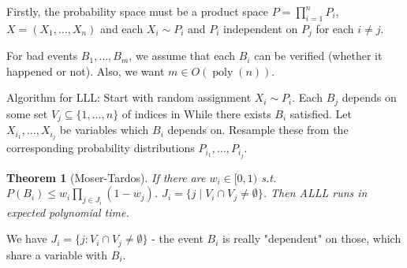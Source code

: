 \documentclass{article}
\theoremstyle{plain}
\newtheorem{thm}{Theorem}
\theoremstyle{definition}
\newcommand{\poly}{\operatorname{poly}}
\begin{document}
Firstly, the probability space must be a product space $P=\prod_{i=1}^n P_i$, $X=(X_1,\ldots, X_n)$ and each $X_i\sim P_i$ and $P_i$ independent on $P_j$ for each $i\neq j$.

For bad events $B_1,\ldots, B_m$, we assume that each $B_i$ can be verified (whether it happened or not). Also, we want $m\in O(\poly(n))$.


Algorithm for LLL: Start with random assignment $X_i\sim P_i$. Each $B_j$ depends on some set $V_j\subseteq \{1,\ldots,n\}$ of indices in While there exists $B_i$ satisfied. Let $X_{i_1},\ldots,X_{i_j}$ be variables which $B_i$ depends on. Resample these from the corresponding probability distributions $P_{i_1},\ldots,P_{i_j}$.

\begin{thm}[Moser-Tardos]
	If there are $w_i\in[0,1)$ s.t. $P(B_i)\leq w_i\prod_{j\in J_i}(1-w_j)$. $J_i=\{j \mid V_i\cap V_j\neq \emptyset\}$. Then ALLL runs in expected polynomial time.
\end{thm}

We have $J_i=\{j: V_i\cap V_j\neq\emptyset\}$ - the event $B_i$ is really "dependent" on those, which share a variable with $B_i$.
\end{document}
